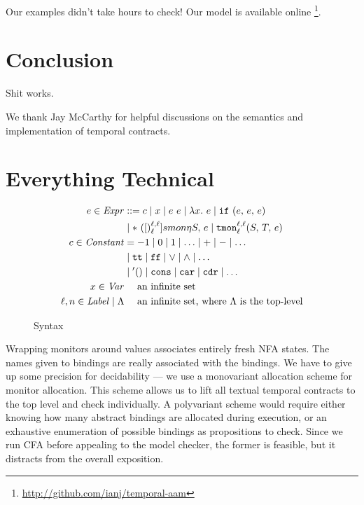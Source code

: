 \documentclass[preprint,onecolumn,9pt]{sigplanconf} %
\begin{document}
Our examples didn't take hours to check!
%
Our model is available online \footnote{\url{http://github.com/ianj/temporal-aam}}.

\section{Conclusion}

Shit works.

\acks We thank Jay McCarthy for helpful discussions on the semantics
and implementation of temporal contracts.


\section{Everything Technical}\label{sec:technical}

\begin{figure}
\begin{align*}
e \in \mathit{Expr} &::=
      c
 \mid x
 \mid e\ e
 \mid \lambda x.\ e
 \mid {\tt if}{\ }({e,\,e,\,e}) \\
&\mid {\tt *}{\ }({[})^{\ell,\ell}_{\ell}]{smon}{\eta}{S,\, e}
 \mid {\tt tmon}{^{\ell,\ell}_{\ell}}({S,\,T,\,e}) \\
c \in \mathit{Constant} &=
 -1 \mid 0 \mid 1 \mid \ldots \mid + \mid - \mid \ldots \\
&\mid {\tt tt} \mid {\tt ff} \mid \vee \mid \wedge \mid \ldots \\
&\mid {\tt '()} \mid \tt cons \mid {\tt car} \mid {\tt cdr} \mid \ldots \\
x \in \mathit{Var} &\quad\text{ an infinite set} \\
\ell,n \in \mathit{Label} \mid \Lambda &\quad\text{ an infinite set, where $\Lambda$ is the top-level}
\end{align*}
\caption{Syntax}
\label{fig:syntax}
\end{figure}

Wrapping monitors around values associates entirely fresh NFA states.
%
The names given to bindings are really associated with the bindings.
%
We have to give up some precision for decidability --- we use a monovariant allocation scheme for monitor allocation.
%
This scheme allows us to lift all textual temporal contracts to the top level and check individually.
%
A polyvariant scheme would require either knowing how many abstract bindings are allocated during execution, or an exhaustive enumeration of possible bindings as propositions to check.
%
Since we run CFA before appealing to the model checker, the former is feasible, but it distracts from the overall exposition.
\end{document}
